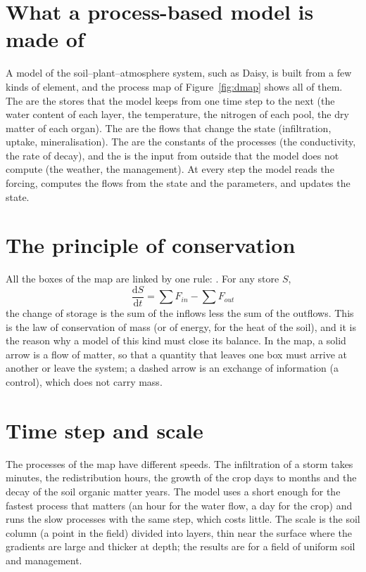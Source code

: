 \section{What a process-based model is made of}
A model of the soil--plant--atmosphere system, such as Daisy, is built from a few kinds of element, and the process map of Figure~\ref{fig:dmap} shows all of them. The  are the stores that the model keeps from one time step to the next (the water content of each layer, the temperature, the nitrogen of each pool, the dry matter of each organ). The  are the flows that change the state (infiltration, uptake, mineralisation). The  are the constants of the processes (the conductivity, the rate of decay), and the  is the input from outside that the model does not compute (the weather, the management). At every step the model reads the forcing, computes the flows from the state and the parameters, and updates the state.

\section{The principle of conservation}
All the boxes of the map are linked by one rule: . For any store $S$,
\begin{equation*}\boxed{\frac{\mathrm dS}{\mathrm dt}=\sum F_{in}-\sum F_{out}}\end{equation*}
the change of storage is the sum of the inflows less the sum of the outflows. This is the law of conservation of mass (or of energy, for the heat of the soil), and it is the reason why a model of this kind must close its balance. In the map, a solid arrow is a flow of matter, so that a quantity that leaves one box must arrive at another or leave the system; a dashed arrow is an exchange of information (a control), which does not carry mass.

\section{Time step and scale}
The processes of the map have different speeds. The infiltration of a storm takes minutes, the redistribution hours, the growth of the crop days to months and the decay of the soil organic matter years. The model uses a  short enough for the fastest process that matters (an hour for the water flow, a day for the crop) and runs the slow processes with the same step, which costs little. The  scale is the soil column (a point in the field) divided into layers, thin near the surface where the gradients are large and thicker at depth; the results are for a field of uniform soil and management.

